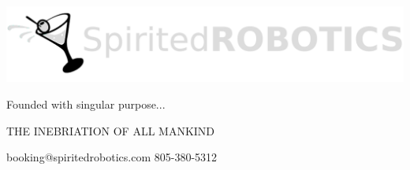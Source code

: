 \documentclass[11pt,a4paper]{memoir}
\begin{document}
\hspace{-1\parindent}\hspace{0.2mm} 
\includegraphics[width=0.8\linewidth]{spirited_robotics_logo.png}
\hspace{-1\parindent}\hspace{-0.207\linewidth} 

\vspace{2em}

Founded with singular purpose...

\hspace{0.05\linewidth}THE INEBRIATION OF ALL MANKIND



\vspace{3.8em}

\hspace{-1\parindent}\hspace{0.5mm} {\tiny  booking@spiritedrobotics.com } 
\hspace{0.34\linewidth} {\tiny 805-380-5312}
\end{document}

